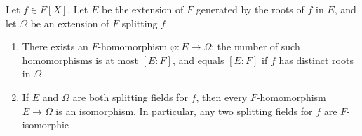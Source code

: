 \documentclass[11pt]{article}
\begin{document}
\begin{proposition}[]
\label{2.7}
Let \(f\in F[X]\). Let \(E\) be the extension of \(F\) generated by the roots of \(f\) in \(E\),
and let \(\Omega\) be an extension of \(F\) splitting \(f\)
\begin{enumerate}
\item There exists an \(F\)-homomorphism \(\varphi:E\to\Omega\); the number of such homomorphisms is at
most \([E:F]\), and equals \([E:F]\) if \(f\) has distinct roots in \(\Omega\)
\item If \(E\) and \(\Omega\) are both splitting fields for \(f\), then every \(F\)-homomorphism \(E\to\Omega\) is
an isomorphism. In particular, any two splitting fields for \(f\) are \(F\)-isomorphic
\end{enumerate}
\end{proposition}
\end{document}
